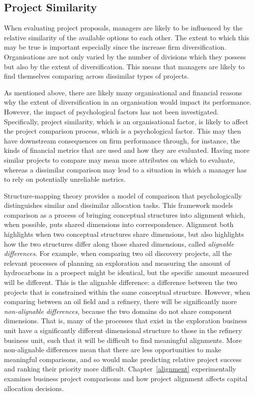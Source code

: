 \documentclass[a4paper, nobind]{templates/ociamthesis}
\theoremstyle{definition}
\theoremstyle{definition}
\theoremstyle{definition}
\theoremstyle{definition}
\theoremstyle{remark}
\begin{document}
\subsection{Project Similarity}

When evaluating project proposals, managers are likely to be influenced by the
relative similarity of the available options to each other. The extent to which
this may be true is important especially since the increase firm
diversification. Organisations are not only varied by the number of divisions
which they possess but also by the extent of diversification. This means that
managers are likely to find themselves comparing across dissimilar types of
projects.

As mentioned above, there are likely many organisational and financial reasons
why the extent of diversification in an organisation would impact its
performance. However, the impact of psychological factors has not been
investigated. Specifically, project similarity, which is an organisational
factor, is likely to affect the project comparison process, which is a
psychological factor. This may then have downstream consequences on firm
performance through, for instance, the kinds of financial metrics that are used
and how they are evaluated. Having more similar projects to compare may mean
more attributes on which to evaluate, whereas a dissimilar comparison may lead
to a situation in which a manager has to rely on potentially unreliable metrics.

Structure-mapping theory \autocite{gentner1997,gentner1983} provides a model of
comparison that psychologically distinguishes similar and dissimilar allocation
tasks. This framework models comparison as a process of bringing conceptual
structures into alignment which, when possible, puts shared dimensions into
correspondence. Alignment both highlights when two conceptual structures share
dimensions, but also highlights how the two structures differ along those shared
dimensions, called \emph{alignable differences}. For example, when comparing two oil
discovery projects, all the relevant processes of planning an exploration and
measuring the amount of hydrocarbons in a prospect might be identical, but the
specific amount measured will be different. This is the alignable difference: a
difference between the two projects that is constrained within the same
conceptual structure. However, when comparing between an oil field and a
refinery, there will be significantly more \emph{non-alignable differences}, because
the two domains do not share component dimensions. That is, many of the
processes that exist in the exploration business unit have a significantly
different dimensional structure to those in the refinery business unit, such
that it will be difficult to find meaningful alignments. More non-alignable
differences mean that there are less opportunities to make meaningful
comparisons, and so would make predicting relative project success and ranking
their priority more difficult. Chapter~\ref{alignment} experimentally examines
business project comparisons and how project alignment affects capital
allocation decisions.
\end{document}
